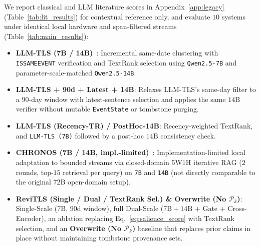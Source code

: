 \documentclass[journal]{IEEEtran}
\begin{document}
We report classical and LLM literature scores in Appendix~\ref{app:legacy} (Table~\ref{tab:lit_results}) for contextual reference only, and evaluate $10$ systems under identical local hardware and span-filtered streams (Table~\ref{tab:main_results}):
\begin{itemize}
    \item \textbf{LLM-TLS (7B / 14B)}~\cite{hu2024moments}: Incremental same-date clustering with \texttt{ISSAMEEVENT} verification and TextRank selection using \texttt{Qwen2.5-7B} and parameter-scale-matched \texttt{Qwen2.5-14B}.
    \item \textbf{LLM-TLS + 90d + Latest + 14B}: Relaxes LLM-TLS's same-day filter to a $90$-day window with latest-sentence selection and applies the same $14\text{B}$ verifier without mutable \texttt{EventState} or tombstone purging.
    \item \textbf{LLM-TLS (Recency-TR) / PostHoc-14B}: Recency-weighted TextRank, and \texttt{LLM-TLS (7B)} followed by a post-hoc $14\text{B}$ consistency check.
    \item \textbf{CHRONOS (7B / 14B, impl.-limited)}~\cite{wu2025unfolding}: Implementation-limited local adaptation to bounded streams via closed-domain $5\text{W}1\text{H}$ iterative RAG ($2$ rounds, top-$15$ retrieval per query) on \texttt{7B} and \texttt{14B} (not directly comparable to the original $72\text{B}$ open-domain setup).
    \item \textbf{ReviTLS (Single / Dual / TextRank Sel.) \& Overwrite (No $\mathcal{P}_k$)}: Single-Scale ($7\text{B}$, $90\text{d}$ window), full Dual-Scale ($7\text{B}+14\text{B}$ + Gate + Cross-Encoder), an ablation replacing Eq.~\eqref{eq:salience_score} with TextRank selection, and an \textbf{Overwrite (No $\mathcal{P}_k$)} baseline that replaces prior claims in place without maintaining tombstone provenance sets.
\end{itemize}
\end{document}
